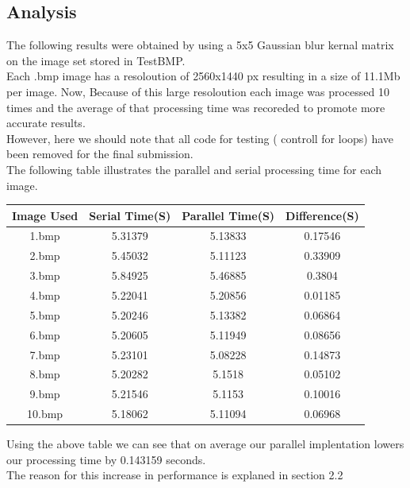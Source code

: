 \documentclass[paper=a4, fontsize=11pt]{scrartcl} %
\numberwithin{equation}{section} %
\numberwithin{figure}{section} %
\numberwithin{table}{section} %
\begin{document}
\subsection{Analysis}
The following results were obtained by using a 5x5 Gaussian blur kernal matrix on the image set stored in TestBMP.\\
Each .bmp image has a resoloution of 2560x1440 px resulting in a size of 11.1Mb per image. Now, Because of this large resoloution each image was processed 10 times and the average of that processing time was recoreded to promote more accurate results.\\


However, here we should note that all code for testing ( controll for loops) have been removed for the final submission.\\

The following table illustrates the parallel and serial processing time for each image.\\

\begin{center}

\begin{tabular}{||c |c |c |c ||}
\hline
\textbf{Image Used} & \textbf{Serial Time(S)} & \textbf{Parallel Time(S)} & \textbf{Difference(S)} \\[0.5ex]
\hline \hline

1.bmp & 5.31379 & 5.13833 & 0.17546 \\
2.bmp & 5.45032 & 5.11123 & 0.33909\\
3.bmp & 5.84925 & 5.46885 & 0.3804\\
4.bmp & 5.22041 & 5.20856 & 0.01185\\
5.bmp & 5.20246 & 5.13382 & 0.06864\\
6.bmp & 5.20605 & 5.11949 & 0.08656\\
7.bmp & 5.23101 & 5.08228 & 0.14873\\
8.bmp & 5.20282 & 5.1518  & 0.05102\\
9.bmp & 5.21546 & 5.1153  & 0.10016\\
10.bmp & 5.18062 & 5.11094 & 0.06968\\[1ex]

\hline

\end{tabular}

\end{center}

Using the above table we can see that on average our parallel implentation lowers our processing time by 0.143159 seconds.\\
The reason for this increase in performance is explaned in section 2.2\\
\end{document}
